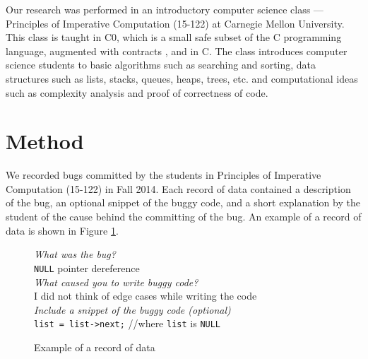 \documentclass{sig-alternate}
\begin{document}
Our research was performed in an introductory computer science class --- Principles of Imperative Computation (15-122) at Carnegie Mellon University. This class is taught in C0, which is a small safe subset of the C programming language, augmented with contracts \cite{Arnold10, PfenningCortinaLovas11}, and in C. The class introduces computer science students to basic algorithms such as searching and sorting, data structures such as lists, stacks, queues, heaps, trees, etc. and computational ideas such as complexity analysis and proof of correctness of code.


\section{Method}
\label{sec:method}

We recorded bugs committed by the students in Principles of Imperative Computation (15-122) in Fall 2014. Each record of data contained a description of the bug, an optional snippet of the buggy code, and a short explanation by the student of the cause behind the committing of the bug. An example of a record of data is shown in Figure \ref{fig:record}.\\ 

\begin{figure}
\begin{framed}
\emph{What was the bug?}\\
\verb|NULL| pointer dereference\\

\emph{What caused you to write buggy code?}\\
 I did not think of edge cases while writing the code\\

\emph{Include a snippet of the buggy code (optional)}\\
\verb|list = list->next;| //where \verb|list| is \verb|NULL|
\end{framed}
\caption{Example of a record of data}
\label{fig:record}
\end{figure}
\end{document}
